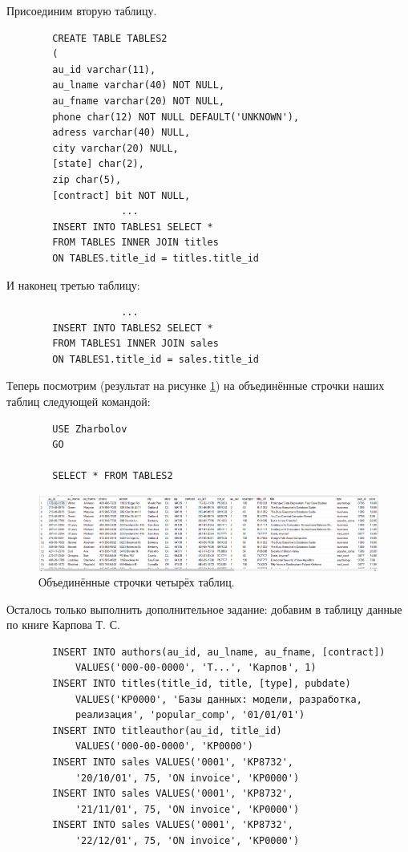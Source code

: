 Присоединим вторую таблицу.

\begin{verbatim}
        CREATE TABLE TABLES2
        (
        au_id varchar(11),
        au_lname varchar(40) NOT NULL,
        au_fname varchar(20) NOT NULL,
        phone char(12) NOT NULL DEFAULT('UNKNOWN'),
        adress varchar(40) NULL,
        city varchar(20) NULL,
        [state] char(2),
        zip char(5),
        [contract] bit NOT NULL,
                    ...
        INSERT INTO TABLES1 SELECT * 
        FROM TABLES INNER JOIN titles
        ON TABLES.title_id = titles.title_id
\end{verbatim}

И наконец третью таблицу:

\begin{verbatim}
                    ...
        INSERT INTO TABLES2 SELECT * 
        FROM TABLES1 INNER JOIN sales
        ON TABLES1.title_id = sales.title_id
\end{verbatim}

Теперь посмотрим (результат на рисунке \ref{fig:INNERDATA}) на объединённые строчки наших таблиц следующей командой:

\begin{verbatim}
        USE Zharbolov
        GO
        
        SELECT * FROM TABLES2
\end{verbatim}

\begin{figure}[h!]
    \centering
    \includegraphics[width=0.9\linewidth]{Pic/lab3/INNERDATA.PNG}
    \caption{Объединённые строчки четырёх таблиц.}
    \label{fig:INNERDATA}
\end{figure}

Осталось только выполнить дополнительное задание: добавим в таблицу данные по книге Карпова Т. С. 
\begin{verbatim}
        INSERT INTO authors(au_id, au_lname, au_fname, [contract]) 
            VALUES('000-00-0000', 'Т...', 'Карпов', 1)
        INSERT INTO titles(title_id, title, [type], pubdate) 
            VALUES('KP0000', 'Базы данных: модели, разработка, 
            реализация', 'popular_comp', '01/01/01')
        INSERT INTO titleauthor(au_id, title_id) 
            VALUES('000-00-0000', 'KP0000')
        INSERT INTO sales VALUES('0001', 'KP8732', 
            '20/10/01', 75, 'ON invoice', 'KP0000')
        INSERT INTO sales VALUES('0001', 'KP8732', 
            '21/11/01', 75, 'ON invoice', 'KP0000')
        INSERT INTO sales VALUES('0001', 'KP8732', 
            '22/12/01', 75, 'ON invoice', 'KP0000')
\end{verbatim}
